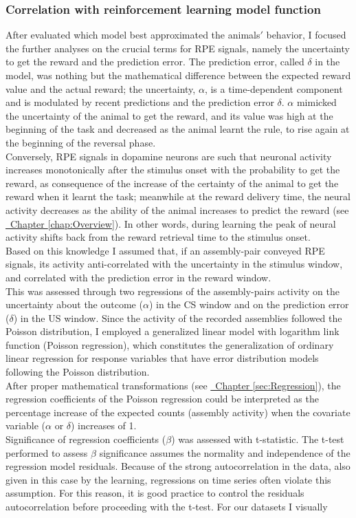 \subsubsection{Correlation with reinforcement learning model function}
After evaluated which model best approximated the animals$'$ behavior, I focused the further analyses on the crucial terms for RPE signals, namely the uncertainty to get the reward and the prediction error. The prediction error, called $\delta$ in the model, was nothing but the mathematical difference between the expected reward value and the actual reward; the uncertainty, $\alpha$, is a time-dependent component and is modulated by recent predictions and the prediction error $\delta$. $\alpha$ mimicked the uncertainty of the animal to get the reward, and its value was high at the beginning of the task and decreased as the animal learnt the rule, to rise again at the beginning of the reversal phase.\\Conversely, RPE signals in dopamine neurons are such that neuronal activity increases monotonically after the stimulus onset with the probability to get the reward, as consequence of the increase of the certainty of the animal to get the reward when it learnt the task; meanwhile at the reward delivery time, the neural activity decreases as the ability of the animal increases to predict the reward (see \hyperref[chap:Overview]{~Chapter \ref*{chap:Overview}}). In other words, during learning the peak of neural activity shifts back from the reward retrieval time to the stimulus onset.\\Based on this knowledge I assumed that, if an assembly-pair conveyed RPE signals, its activity anti-correlated with the uncertainty in the stimulus window, and correlated with the prediction error in the reward window.\\This was assessed through two regressions of the assembly-pairs activity on the uncertainty about the outcome ($\alpha$) in the CS window and on the prediction error ($\delta$) in the US window. Since the activity of the recorded assemblies followed the Poisson distribution, I employed a generalized linear model with logarithm link function (Poisson regression), which constitutes the generalization of ordinary linear regression for response variables that have error distribution models following the Poisson distribution.\\After proper mathematical transformations (see \hyperref[sec:Regression]{~Chapter \ref*{sec:Regression}}), the regression coefficients of the Poisson regression could be interpreted as the percentage increase of the expected counts (assembly activity) when the covariate variable ($\alpha$ or $\delta$) increases of 1.\\Significance of regression coefficients ($\beta$) was assessed with t-statistic. The t-test performed to assess $\beta$ significance assumes the normality and independence of the regression model residuals. Because of the strong autocorrelation in the data, also given in this case by the learning, regressions on time series often violate this assumption. For this reason, it is good practice to control the residuals autocorrelation before proceeding with the t-test. For our datasets I visually 